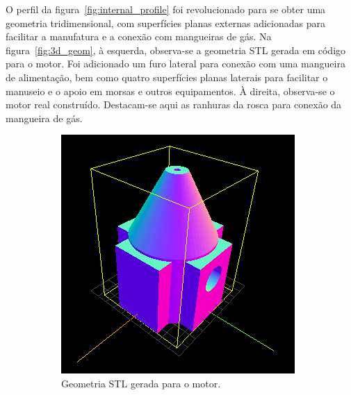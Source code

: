 O perfil da figura~\ref{fig:internal_profile} foi revolucionado para se obter uma geometria tridimensional, com superfícies planas externas adicionadas para facilitar a manufatura e a conexão com mangueiras de gás. Na figura~\ref{fig:3d_geom}, à esquerda, observa-se a geometria STL gerada em código para o motor. Foi adicionado um furo lateral para conexão com uma mangueira de alimentação, bem como quatro superfícies planas laterais para facilitar o manuseio e o apoio em morsas e outros equipamentos. À direita, observa-se o motor real construído. Destacam-se aqui as ranhuras da rosca para conexão da mangueira de gás.

\begin{figure}[htbp]
    \centering
    \begin{subfigure}{0.49\textwidth}
        \includegraphics[width=\textwidth]{img/motor_stl.png}
        \caption{Geometria STL gerada para o motor.}
    \end{subfigure}
    \begin{subfigure}{0.49\textwidth}

\end{subfigure}
\end{figure}
